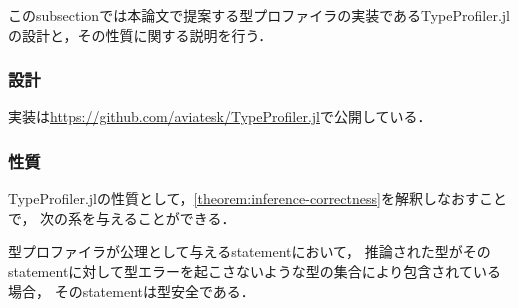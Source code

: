 このsubsectionでは本論文で提案する型プロファイラの実装であるTypeProfiler.jlの設計と，その性質に関する説明を行う．

\subsubsection{設計} \label{subsubsection:type-profiler-design}



実装は\url{https://github.com/aviatesk/TypeProfiler.jl}で公開している．

\subsubsection{性質} \label{subsubsection:type-profiler-property}

TypeProfiler.jlの性質として，\ref{theorem:inference-correctness}を解釈しなおすことで，
次の系を与えることができる．

\begin{corollary*}[型プロファイラの型安全性]
  型プロファイラが公理として与えるstatementにおいて，
  推論された型がそのstatementに対して型エラーを起こさないような型の集合により包含されている場合，
  そのstatementは型安全である．
\end{corollary*}



